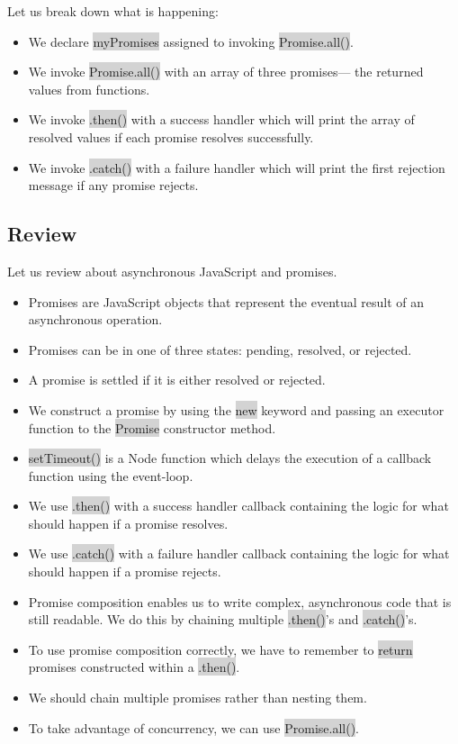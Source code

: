 \documentclass[11pt]{article}
\begin{document}
Let us break down what is happening:
\begin{itemize}[leftmargin = *]
\item We declare \colorbox{lightgray}{myPromises} assigned to invoking \colorbox{lightgray}{Promise.all()}.
\item We invoke \colorbox{lightgray}{Promise.all()} with an array of three promises— the returned values from functions.
\item We invoke \colorbox{lightgray}{.then()} with a success handler which will print the array of resolved values if each promise resolves successfully.
\item We invoke \colorbox{lightgray}{.catch()} with a failure handler which will print the first rejection message if any promise rejects.
\end{itemize}

\subsection{Review}
Let us review about asynchronous JavaScript and promises. 
\begin{itemize}[leftmargin = *]
\item Promises are JavaScript objects that represent the eventual result of an asynchronous operation.
\item Promises can be in one of three states: pending, resolved, or rejected.
\item A promise is settled if it is either resolved or rejected.
\item We construct a promise by using the \colorbox{lightgray}{new} keyword and passing an executor function to the \colorbox{lightgray}{Promise} constructor method.
\item \colorbox{lightgray}{setTimeout()} is a Node function which delays the execution of a callback function using the event-loop.
\item We use \colorbox{lightgray}{.then()} with a success handler callback containing the logic for what should happen if a promise resolves.
\item We use \colorbox{lightgray}{.catch()} with a failure handler callback containing the logic for what should happen if a promise rejects.
\item Promise composition enables us to write complex, asynchronous code that is still readable. We do this by chaining multiple \colorbox{lightgray}{.then()}'s and \colorbox{lightgray}{.catch()}'s.
\item To use promise composition correctly, we have to remember to \colorbox{lightgray}{return} promises constructed within a \colorbox{lightgray}{.then()}.
\item We should chain multiple promises rather than nesting them.
\item To take advantage of concurrency, we can use \colorbox{lightgray}{Promise.all()}.
\end{itemize}
\end{document}

